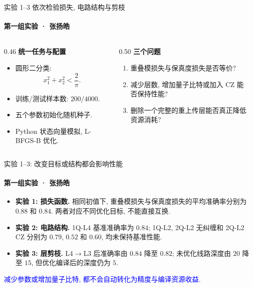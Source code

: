\documentclass{ctexbeamer}
\begin{document}
\begin{frame}{实验 1--3 依次检验损失, 电路结构与剪枝}
    \framesubtitle{第一组实验 · 张扬皓}
    \begin{columns}[T]
        \begin{column}{0.46\textwidth}
            \textbf{统一任务与配置}
            \begin{itemize}
                \setlength{\itemsep}{0.9ex}
                \item 圆形二分类:
                \[
                    x_1^2+x_2^2<\frac{2}{\pi}.
                \]
                \item 训练/测试样本数: $200/4000$.
                \item 五个参数初始化随机种子.
                \item Python 状态向量模拟, L-BFGS-B 优化.
            \end{itemize}
        \end{column}
        \begin{column}{0.50\textwidth}
            \textbf{三个问题}
            \begin{enumerate}
                \setlength{\itemsep}{1.3ex}
                \item 重叠模损失与保真度损失是否等价?
                \item 减少层数, 增加量子比特或加入 CZ 能否保持性能?
                \item 删除一个完整的重上传层能否真正降低资源消耗?
            \end{enumerate}
        \end{column}
    \end{columns}
\end{frame}

\begin{frame}{实验 1--3: 改变目标或结构都会影响性能}
    \framesubtitle{第一组实验 · 张扬皓}
    \begin{itemize}
        \setlength{\itemsep}{1.2ex}
        \item \textbf{实验 1: 损失函数.} 相同初值下, 重叠模损失与保真度损失的平均准确率分别为 $0.88$ 和 $0.84$. 两者对应不同优化目标, 不能直接互换.
        \item \textbf{实验 2: 电路结构.} 1Q-L4 基准准确率为 $0.84$; 1Q-L2, 2Q-L2 无纠缠和 2Q-L2 CZ 分别为 $0.79$, $0.52$ 和 $0.60$, 均未保持基准性能.
        \item \textbf{实验 3: 层剪枝.} L4$\to$L3 后准确率由 $0.84$ 降至 $0.82$; 未优化线路深度由 $20$ 降至 $15$, 但优化编译后的深度仍为 $5$.
    \end{itemize}
    \vspace{0.5em}
    \begin{center}
        \textcolor{blue}{减少参数或增加量子比特, 都不会自动转化为精度与编译资源收益.}
    \end{center}
\end{frame}
\end{document}
